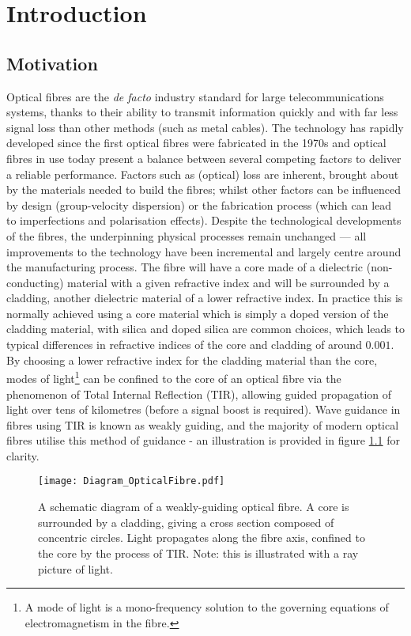 \chapter{Introduction} \label{ch:Intro}

\section{Motivation} \label{sec:ProjectMotivation}
Optical fibres are the \textit{de facto} industry standard for large telecommunications systems, thanks to their ability to transmit information quickly and with far less signal loss than other methods (such as metal cables).
The technology has rapidly developed since the first optical fibres were fabricated in the 1970s \cite{knight2003photonic} and optical fibres in use today present a balance between several competing factors to deliver a reliable performance.
Factors such as (optical) loss are inherent, brought about by the materials needed to build the fibres; whilst other factors can be influenced by design (group-velocity dispersion) or the fabrication process (which can lead to imperfections and polarisation effects).
Despite the technological developments of the fibres, the underpinning physical processes remain unchanged --- all improvements to the technology have been incremental and largely centre around the manufacturing process.
The fibre will have a core made of a dielectric (non-conducting) material with a given refractive index and will be surrounded by a cladding, another dielectric material of a lower refractive index.
In practice this is normally achieved using a core material which is simply a doped version of the cladding material, with silica and doped silica are common choices, which leads to typical differences in refractive indices of the core and cladding of around $0.001$.
By choosing a lower refractive index for the cladding material than the core, modes of light\footnote{A mode of light is a mono-frequency solution to the governing equations of electromagnetism in the fibre.} can be confined to the core of an optical fibre via the phenomenon of Total Internal Reflection (TIR), allowing guided propagation of light over tens of kilometres (before a signal boost is required).
Wave guidance in fibres using TIR is known as weakly guiding, and the majority of modern optical fibres utilise this method of guidance - an illustration is provided in figure \ref{fig:Diagram_OpticalFibre} for clarity. \newline
\begin{figure}[h]
	\centering
	\texttt{[image: Diagram\_OpticalFibre.pdf]}
	\caption{\label{fig:Diagram_OpticalFibre} A schematic diagram of a weakly-guiding optical fibre. A core is surrounded by a cladding, giving a cross section composed of concentric circles. Light propagates along the fibre axis, confined to the core by the process of TIR. Note: this is illustrated with a ray picture of light.}
\end{figure} 

